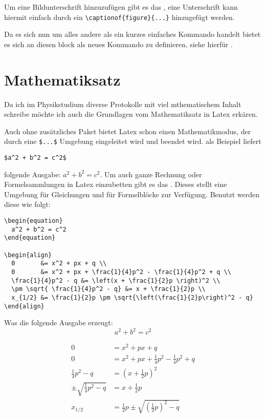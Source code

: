 Um eine Bildunterschrift hinzuzufügen gibt es das , eine Unterschrift kann hiermit einfach
durch ein \verb+\captionof{figure}{...}+ hinzugefügt werden.

Da es sich nun um alles andere als ein kurzes einfaches Kommando handelt bietet es sich an diesen block als neues
Kommando zu definieren, siehe hierfür .

\section{Mathematiksatz}
Da ich im Physikstudium diverse Protokolle mit viel mthematischem Inhalt schreibe möchte ich auch die
Grundlagen vom Mathematiksatz in Latex erkären.

Auch ohne zusätzliches Paket bietet Latex schon einen Mathematikmodus, der durch eine \verb+$...$+
Umgebung eingeleitet wird und beendet wird. als Beispiel liefert
\begin{verbatim}
$a^2 + b^2 = c^2$
\end{verbatim}
folgende Ausgabe:
$a^2 + b^2 = c^2$. Um auch ganze Rechnung oder Formelsammlungen in Latex einzubetten gibt es das
. Dieses stellt eine Umgebung für Gleichungen und für Formelblöcke zur Verfügung.
Benutzt werden diese wie folgt:
\begin{verbatim}
\begin{equation}
  a^2 + b^2 = c^2
\end{equation}

\begin{align}
  0       &= x^2 + px + q \\
  0       &= x^2 + px + \frac{1}{4}p^2 - \frac{1}{4}p^2 + q \\
  \frac{1}{4}p^2 - q &= \left(x + \frac{1}{2}p \right)^2 \\
  \pm \sqrt{ \frac{1}{4}p^2 - q} &= x + \frac{1}{2}p \\
  x_{1/2} &= \frac{1}{2}p \pm \sqrt{\left(\frac{1}{2}p\right)^2 - q}  
\end{align}
\end{verbatim}
Was die folgende Ausgabe erzeugt:
\begin{equation}
  a^2 + b^2 = c^2
\end{equation}

\begin{align}
  0                  &= x^2 + px + q \\
  0                  &= x^2 + px + \frac{1}{4}p^2 - \frac{1}{4}p^2 + q \\
  \frac{1}{4}p^2 - q &= \left(x + \frac{1}{2}p \right)^2 \\
  \pm \sqrt{ \frac{1}{4}p^2 - q} &= x + \frac{1}{2}p \\
  x_{1/2}            &= \frac{1}{2}p \pm \sqrt{\left(\frac{1}{2}p\right)^2 - q}  
\end{align}

